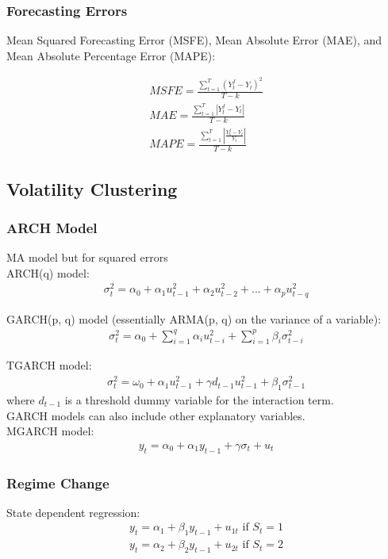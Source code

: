 \documentclass[12pt]{article}
\numberwithin{equation}{section}
\begin{document}
\subsubsection{Forecasting Errors}
Mean Squared Forecasting Error (MSFE), Mean Absolute Error (MAE), and Mean Absolute Percentage Error (MAPE):

\begin{gather}
    MSFE = \frac{\sum\limits_{t=1}^{T} (Y_t^f - Y_t)^2}{T-k} \\
    MAE = \frac{\sum\limits_{t=1}^{T} |Y_t^f - Y_t|}{T-k} \\
    MAPE = \frac{\sum\limits_{t=1}^{T} |\frac{Y_t^f - Y_t}{Y_t}|}{T-k}
\end{gather}

\subsection{Volatility Clustering}

\subsubsection{ARCH Model}
MA model but for squared errors \\[0.5cm]
ARCH(q) model:
\begin{gather}
    \sigma_t^2 = \alpha_0 + \alpha_1 u_{t-1}^2 + \alpha_2 u_{t-2}^2 + ... + \alpha_p u_{t-q}^2
\end{gather}

GARCH(p, q) model (essentially ARMA(p, q) on the variance of a variable):
\begin{gather}
    \sigma_t^2 = \alpha_0 + \sum_{i=1}^q \alpha_i u_{t-i}^2 + \sum_{i=1}^p \beta_i \sigma_{t-i}^2
\end{gather}

TGARCH model:
\begin{gather}
    \sigma_t^2 = \omega_0 + \alpha_1 u_{t-1}^2 + \gamma d_{t-1} u_{t-1}^2 + \beta_1 \sigma_{t-1}^2
\end{gather}
where $d_{t-1}$ is a threshold dummy variable for the interaction term. \\[0.5cm]
GARCH models can also include other explanatory variables. \\[0.5cm]
MGARCH model:
\begin{gather}
    y_t = \alpha_0 + \alpha_1 y_{t-1} + \gamma \sigma_t + u_t
\end{gather}

\subsubsection{Regime Change}
State dependent regression:
\begin{gather}
    y_t = \alpha_1 + \beta_1 y_{t-1} + u_{1t} \text{ if } S_t = 1 \\
    y_t = \alpha_2 + \beta_2 y_{t-1} + u_{2t} \text{ if } S_t = 2
\end{gather}
\end{document}
